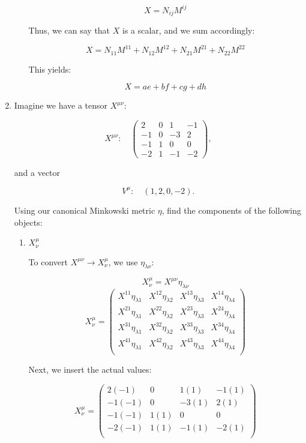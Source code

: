 \begin{enumerate}
\begin{enumerate}
        $$X=N_{ij}M^{ij}$$

        Thus, we can say that $X$ is a scalar, and we sum accordingly:

        $$X=N_{11}M^{11}+N_{12}M^{12}+N_{21}M^{21}+N_{22}M^{22}$$

        This yields:

        $$\boxed{X=ae+bf+cg+dh}$$

    \end{enumerate}

  \item Imagine we have a tensor $X^{\mu\nu}$:

    $$X^{\mu\nu}:\quad \left( \begin{matrix} 2 & 0 & 1 & -1 \\ -1 & 0 & -3 & 2\\ -1 & 1 & 0 & 0\\ -2 & 1 & -1 & -2\end{matrix} \right),$$

    and a vector

    $$V^{\mu}:\quad (1, 2, 0, -2).$$

    Using our canonical Minkowski metric $\eta$, find the components of the following objects:

    \begin{enumerate}

      \item $X^{\mu}_{\nu}$

        To convert $X^{\mu\nu}\to X^{\mu}_{\nu}$, we use $\eta_{\lambda\nu}$:
        
        $$X_{\nu}^{\mu}=X^{\mu\nu}\eta_{\lambda\nu}$$
        $$X_{\nu}^{\mu}=\left( \begin{matrix} X^{11}\eta_{\lambda1} & X^{12}\eta_{\lambda2} & X^{13}\eta_{\lambda3} & X^{14}\eta_{\lambda4} \\ X^{21}\eta_{\lambda1} & X^{22}\eta_{\lambda2} & X^{23}\eta_{\lambda3} & X^{24}\eta_{\lambda4}\\ X^{31}\eta_{\lambda1} & X^{32}\eta_{\lambda2} & X^{33}\eta_{\lambda3} & X^{34}\eta_{\lambda4}\\ X^{41}\eta_{\lambda1} & X^{42}\eta_{\lambda2} & X^{43}\eta_{\lambda3} & X^{44}\eta_{\lambda4}\\ \end{matrix}\right)$$

        Next, we insert the actual values:

        $$X_{\nu}^{\mu}=\left( \begin{matrix} 2(-1) & 0 & 1(1) & -1(1) \\ -1(-1) & 0 & -3(1) & 2(1)\\ -1(-1) & 1(1) & 0 & 0\\ -2(-1) & 1(1) & -1(1) & -2(1)\\ \end{matrix}\right)$$


\end{enumerate}
\end{enumerate}
